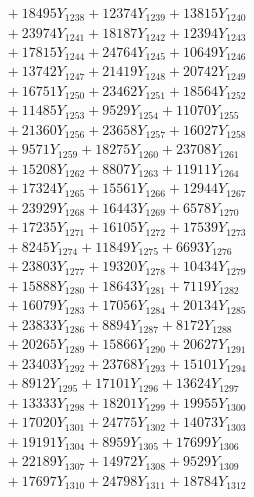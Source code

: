 \documentclass[a4paper,10pt]{article}
\begin{document}
{\begin{align}
&\;  + 18495 Y_{1238} + 12374 Y_{1239} + 13815 Y_{1240} \\[0.3ex]
&\;  + 23974 Y_{1241} + 18187 Y_{1242} + 12394 Y_{1243} \\[0.3ex]
&\;  + 17815 Y_{1244} + 24764 Y_{1245} + 10649 Y_{1246} \\[0.3ex]
&\;  + 13742 Y_{1247} + 21419 Y_{1248} + 20742 Y_{1249} \\[0.3ex]
&\;  + 16751 Y_{1250} + 23462 Y_{1251} + 18564 Y_{1252} \\[0.3ex]
&\;  + 11485 Y_{1253} + 9529 Y_{1254} + 11070 Y_{1255} \\[0.3ex]
&\;  + 21360 Y_{1256} + 23658 Y_{1257} + 16027 Y_{1258} \\[0.5ex]\allowbreak
&\;  + 9571 Y_{1259} + 18275 Y_{1260} + 23708 Y_{1261} \\[0.3ex]
&\;  + 15208 Y_{1262} + 8807 Y_{1263} + 11911 Y_{1264} \\[0.3ex]
&\;  + 17324 Y_{1265} + 15561 Y_{1266} + 12944 Y_{1267} \\[0.3ex]
&\;  + 23929 Y_{1268} + 16443 Y_{1269} + 6578 Y_{1270} \\[0.3ex]
&\;  + 17235 Y_{1271} + 16105 Y_{1272} + 17539 Y_{1273} \\[0.3ex]
&\;  + 8245 Y_{1274} + 11849 Y_{1275} + 6693 Y_{1276} \\[0.3ex]
&\;  + 23803 Y_{1277} + 19320 Y_{1278} + 10434 Y_{1279} \\[0.3ex]
&\;  + 15888 Y_{1280} + 18643 Y_{1281} + 7119 Y_{1282} \\[0.3ex]
&\;  + 16079 Y_{1283} + 17056 Y_{1284} + 20134 Y_{1285} \\[0.3ex]
&\;  + 23833 Y_{1286} + 8894 Y_{1287} + 8172 Y_{1288} \\[0.5ex]\allowbreak
&\;  + 20265 Y_{1289} + 15866 Y_{1290} + 20627 Y_{1291} \\[0.3ex]
&\;  + 23403 Y_{1292} + 23768 Y_{1293} + 15101 Y_{1294} \\[0.3ex]
&\;  + 8912 Y_{1295} + 17101 Y_{1296} + 13624 Y_{1297} \\[0.3ex]
&\;  + 13333 Y_{1298} + 18201 Y_{1299} + 19955 Y_{1300} \\[0.3ex]
&\;  + 17020 Y_{1301} + 24775 Y_{1302} + 14073 Y_{1303} \\[0.3ex]
&\;  + 19191 Y_{1304} + 8959 Y_{1305} + 17699 Y_{1306} \\[0.3ex]
&\;  + 22189 Y_{1307} + 14972 Y_{1308} + 9529 Y_{1309} \\[0.3ex]
&\;  + 17697 Y_{1310} + 24798 Y_{1311} + 18784 Y_{1312} \\[0.3ex]

\end{align}}
\end{document}
